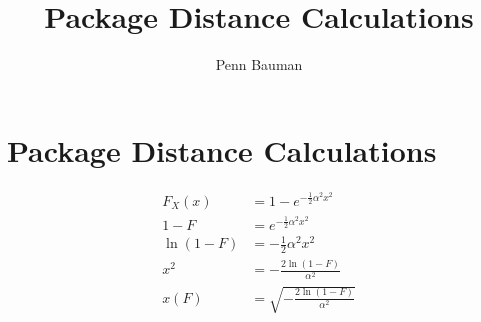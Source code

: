 \documentclass[12pt]{article}
\author{Penn Bauman}
\title{Package Distance Calculations}
\begin{document}
\section{Package Distance Calculations}

\begin{align*}
	F_X(x) &= 1 - e^{-\frac{1}{2}\alpha^2x^2} \\
	1 - F &= e^{-\frac{1}{2}\alpha^2x^2} \\
	\ln(1 - F) &= -\frac{1}{2}\alpha^2x^2 \\
	x^2 &= -\frac{2 \ln(1 - F)}{\alpha^2} \\
	x(F) &= \sqrt{-\frac{2 \ln(1 - F)}{\alpha^2}} \\
\end{align*}
\end{document}
